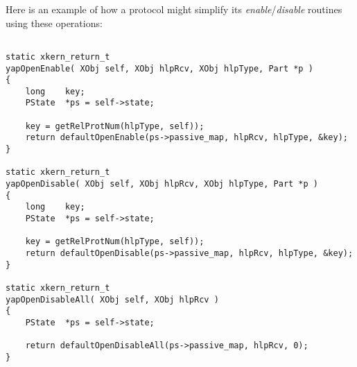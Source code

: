 Here is an example of how a protocol might simplify its 
{\em enable}/{\em disable} routines using these operations:

\begin{verbatim}

static xkern_return_t
yapOpenEnable( XObj self, XObj hlpRcv, XObj hlpType, Part *p )
{
    long    key;
    PState  *ps = self->state;
    
    key = getRelProtNum(hlpType, self));
    return defaultOpenEnable(ps->passive_map, hlpRcv, hlpType, &key);
}

static xkern_return_t
yapOpenDisable( XObj self, XObj hlpRcv, XObj hlpType, Part *p )
{
    long    key;
    PState  *ps = self->state;
    
    key = getRelProtNum(hlpType, self));
    return defaultOpenDisable(ps->passive_map, hlpRcv, hlpType, &key);
}

static xkern_return_t
yapOpenDisableAll( XObj self, XObj hlpRcv )
{
    PState  *ps = self->state;

    return defaultOpenDisableAll(ps->passive_map, hlpRcv, 0);
}
\end{verbatim}
